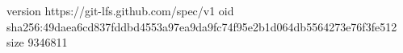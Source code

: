 version https://git-lfs.github.com/spec/v1
oid sha256:49daea6cd837fddbd4553a97ea9da9fc74f95e2b1d064db5564273e76f3fe512
size 9346811
